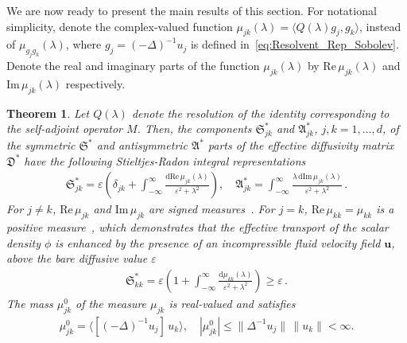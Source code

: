 \documentclass[english,12pt,jmp,graphicx]{revtex4-1}
\newcommand{\vecu}{\boldsymbol{u}}
\newcommand{\bnabla}{\mbox{\boldmath${\nabla}$}}
\newcommand{\bcdot}{\mbox{\boldmath${\cdot}$}}
\newcommand{\Sg}{\mathfrak{S}}
\newcommand{\Ag}{\mathfrak{A}}
\newcommand{\Dg}{\mathfrak{D}}
\renewcommand{\d}{\mathrm{d}}
\newtheorem{theorem}{Theorem}
\newcommand{\Real}{\mbox{Re}\,}
\newcommand{\Imag}{\mbox{Im}\,}
\begin{document}
We are now ready to present the main results of this section. For
notational simplicity, denote the complex-valued function
$\mu_{jk}(\lambda)=\langle Q(\lambda)g_j,g_k\rangle$, instead of
$\mu_{g_jg_k}(\lambda)$, where $g_j=(-\Delta)^{-1}u_j$ is defined
in~\eqref{eq:Resolvent_Rep_Sobolev}. Denote the real and imaginary
parts of the function $\mu_{jk}(\lambda)$ by  $\Real\mu_{jk}(\lambda)$
and $\Imag\mu_{jk}(\lambda)$ respectively.  
%
\begin{theorem}\label{thm:Int_Rep_Sobolev}
%
Let $Q(\lambda)$ denote the resolution of the identity corresponding
to the self-adjoint operator $M$. Then, the components $\Sg^*_{jk}$
and $\Ag^*_{jk}$, 
$j,k=1,\ldots,d$, of the symmetric $\Sg^*$ and antisymmetric $\Ag^*$
parts of the effective diffusivity matrix $\Dg^*$ have the following
Stieltjes-Radon integral representations 
%
\begin{align}\label{eq:Integral_Rep_kappa*}
  \Sg^*_{jk}=\varepsilon\left(\delta_{jk}
             +\int_{-\infty}^\infty
             \frac{\d\Real\mu_{jk}(\lambda)}{\varepsilon^2+\lambda^2}\right),
  \quad
  \Ag^*_{jk}=\int_{-\infty}^\infty\frac{\lambda\, \d\Imag\mu_{jk}(\lambda)}{\varepsilon^2+\lambda^2}\,.
\end{align}
%
For $j\ne k$, $\Real\mu_{jk}$ and $\Imag\mu_{jk}$ are signed
measures~\cite{Folland:99:RealAnalysis}. For $j=k$, 
$\Real\mu_{kk}=\mu_{kk}$ is a positive
measure~\cite{Folland:99:RealAnalysis}, which demonstrates that the
effective transport of the scalar density $\phi$ is enhanced by
the presence of an incompressible fluid velocity field $\vecu$, above
the bare diffusive value $\varepsilon$
%
\begin{align}\label{eq:Skk}
  \Sg^*_{kk}=\varepsilon\left(1
             +\int_{-\infty}^\infty
             \frac{\d\mu_{kk}(\lambda)}{\varepsilon^2+\lambda^2}\right)
           \ge\varepsilon\,.
\end{align}
%
The mass $\mu^0_{jk}$ of the measure $\mu_{jk}$ is real-valued and satisfies
%
\begin{align}\label{eq:Mass_Sobolev}
  \mu^0_{jk}  %
        =\langle[(-\Delta)^{-1}u_j]\,u_k\rangle,
        \quad
        |\mu^0_{jk}|\leq\|\Delta^{-1}u_j\|\,\|u_k\|<\infty.
\end{align}
%
%  
\end{theorem}
\end{document}
